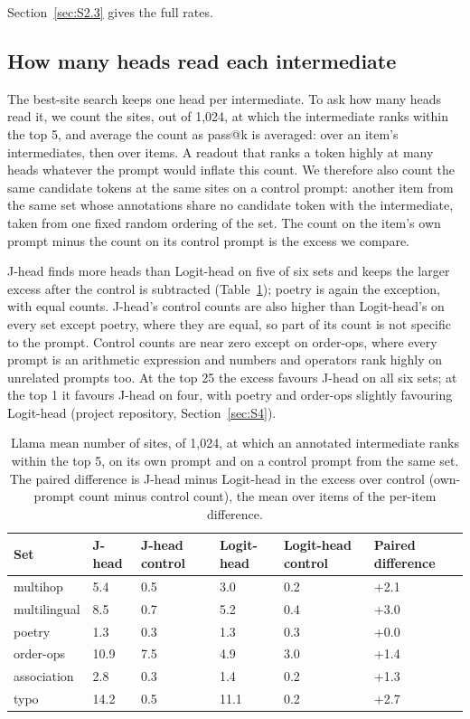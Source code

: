 \documentclass[11pt,a4paper]{article}
\begin{document}
Section~\ref{sec:S2.3} gives the full rates.

\subsection{How many heads read each intermediate}\label{sec:3.6}

The best-site search keeps one head per intermediate. To ask how many heads read it, we count the sites, out of 1,024, at which the intermediate ranks within the top 5, and average the count as pass@k is averaged: over an item's intermediates, then over items. A readout that ranks a token highly at many heads whatever the prompt would inflate this count. We therefore also count the same candidate tokens at the same sites on a control prompt: another item from the same set whose annotations share no candidate token with the intermediate, taken from one fixed random ordering of the set. The count on the item's own prompt minus the count on its control prompt is the excess we compare.

J-head finds more heads than Logit-head on five of six sets and keeps the larger excess after the control is subtracted (Table~\ref{tab:sitecount}); poetry is again the exception, with equal counts. J-head's control counts are also higher than Logit-head's on every set except poetry, where they are equal, so part of its count is not specific to the prompt. Control counts are near zero except on order-ops, where every prompt is an arithmetic expression and numbers and operators rank highly on unrelated prompts too. At the top 25 the excess favours J-head on all six sets; at the top 1 it favours J-head on four, with poetry and order-ops slightly favouring Logit-head (project repository, Section~\ref{sec:S4}).

\begin{table}[htbp]
\centering
\small
\setlength{\tabcolsep}{4pt}
\caption{Llama mean number of sites, of 1,024, at which an annotated intermediate ranks within the top 5, on its own prompt and on a control prompt from the same set. The paired difference is J-head minus Logit-head in the excess over control (own-prompt count minus control count), the mean over items of the per-item difference.}
\label{tab:sitecount}
\begin{tabular}{@{}llllll@{}}
\toprule
Set & J-head & J-head control & Logit-head & Logit-head control & Paired difference \\
\midrule
multihop & 5.4 & 0.5 & 3.0 & 0.2 & +2.1 \\
multilingual & 8.5 & 0.7 & 5.2 & 0.4 & +3.0 \\
poetry & 1.3 & 0.3 & 1.3 & 0.3 & +0.0 \\
order-ops & 10.9 & 7.5 & 4.9 & 3.0 & +1.4 \\
association & 2.8 & 0.3 & 1.4 & 0.2 & +1.3 \\
typo & 14.2 & 0.5 & 11.1 & 0.2 & +2.7 \\
\bottomrule
\end{tabular}
\end{table}
\end{document}

